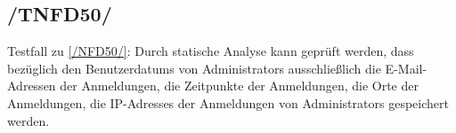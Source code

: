 \subsection*{/TNFD50/}
\label{/TNFD50/} Testfall zu \ref{/NFD50/}: Durch \gls{statische Analyse} kann geprüft werden, dass bezüglich den \Glspl{Benutzerdatum} von \Glspl{Administrator} ausschließlich die E-Mail-Adressen der Anmeldungen, die Zeitpunkte der Anmeldungen, die Orte der Anmeldungen, die \Glspl{IP-Adresse} der Anmeldungen von \Glspl{Administrator} gespeichert werden.